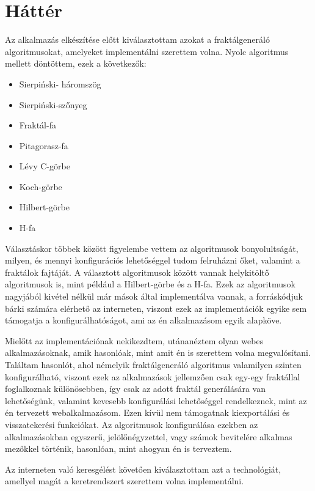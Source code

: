 \chapter{Háttér}

Az alkalmazás elkészítése előtt kiválasztottam azokat a fraktálgeneráló algoritmusokat, amelyeket implementálni szerettem volna. Nyolc algoritmus mellett döntöttem, ezek a következők: 
\begin{itemize}
	\item Sierpiński- háromszög
	\item Sierpiński-szőnyeg
	\item Fraktál-fa
	\item Pitagorasz-fa
	\item Lévy C-görbe
	\item Koch-görbe
	\item Hilbert-görbe
	\item H-fa
\end{itemize}
Választáskor többek között figyelembe vettem az algoritmusok bonyolultságát, milyen, és mennyi konfigurációs lehetőséggel tudom felruházni őket, valamint a fraktálok fajtáját. A választott algoritmusok között vannak helykitöltő algoritmusok is, mint például a Hilbert-görbe és a H-fa. Ezek az algoritmusok nagyjából kivétel nélkül már mások által implementálva vannak, a forráskódjuk bárki számára elérhető az interneten, viszont ezek az implementációk egyike sem támogatja a konfigurálhatóságot, ami az én alkalmazásom egyik alapköve. 
\par Mielőtt az implementációnak nekikezdtem, utánanéztem olyan webes alkalmazásoknak, amik hasonlóak, mint amit én is szerettem volna megvalósítani. Találtam hasonlót, ahol némelyik fraktálgeneráló algoritmus valamilyen szinten konfigurálható, viszont ezek az alkalmazások jellemzően csak egy-egy fraktállal foglalkoznak különösebben, így csak az adott fraktál generálására van lehetőségünk, valamint kevesebb konfigurálási lehetőséggel rendelkeznek, mint az én tervezett webalkalmazásom. Ezen kívül nem támogatnak kiexportálási és visszatekerési funkciókat. Az algoritmusok konfigurálása ezekben az alkalmazásokban egyszerű, jelölőnégyzettel, vagy számok bevitelére alkalmas mezőkkel történik, hasonlóan, mint ahogyan én is terveztem. 
\par Az interneten való keresgélést követően kiválasztottam azt a technológiát, amellyel magát a keretrendszert szerettem volna implementálni.
